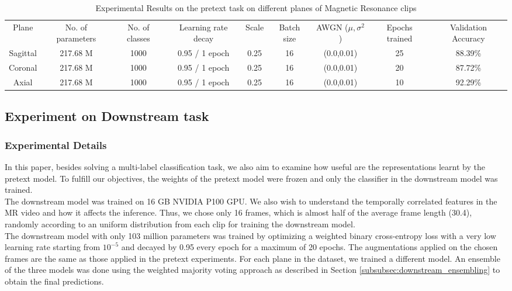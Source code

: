 \documentclass[journal]{IEEEtai}
\begin{document}
\begin{table*}[!ht]
    \centering
    \bgroup
    \caption{Experimental Results on the pretext task on different planes of Magnetic Resonance clips}
    \def\arraystretch{1.5}
    \begin{tabular}{c|c|c|c|c|c|c|c|c}
    \hline
       \multirow{2}{*}{Plane} & \multirow{2}{1.5cm}{\centering No. of parameters} & \multirow{2}{1cm}{\centering No. of classes} & \multirow{2}{2cm}{\centering Learning rate decay} & \multirow{2}{*}{Scale} & \multirow{2}{1cm}{\centering Batch size} & \multirow{2}{1.5cm}{\centering AWGN ($\mu,\sigma^2$)} & \multirow{2}{1.0cm}{\centering Epochs trained} & \multirow{2}{1.5cm}{\centering Validation Accuracy}\\
       {} &{} &{} &{} &{} &{} &{} &{} &{}   \\\hline \hline
Sagittal & 217.68 M & 1000 & 0.95 / 1 epoch & 0.25 & 16  & (0.0,0.01) & 25 & 88.39\%\\ \hline
Coronal & 217.68 M & 1000 & 0.95 / 1 epoch & 0.25 & 16  & (0.0,0.01) & 20 & 87.72\% \\\hline
Axial & 217.68 M & 1000 & 0.95 / 1 epoch & 0.25 & 16  & (0.0,0.01) & 10 & 92.29\%\\ \hline
    \end{tabular}
    \label{tab:exp_pretext}
    \egroup
\end{table*}




\subsection{Experiment on Downstream task}
\label{subsec:exp_downstream}

\subsubsection{Experimental Details}
\label{subsubsec:down_exp_det}
\indent In this paper, besides solving a multi-label classification task, we also aim to examine how useful are the representations learnt by the pretext model. To fulfill our objectives, the weights of the pretext model were frozen and only the classifier in the downstream model was trained.\\ \indent The downstream model was trained on 16 GB NVIDIA P100 GPU. We also wish to understand the temporally correlated features in the MR video and how it affects the inference. Thus, we chose only 16 frames, which is almost half of the average frame length (30.4), randomly according to an uniform distribution from each clip for training the downstream model. \\
\indent The downstream model with only 103 million parameters was trained by optimizing a weighted binary cross-entropy loss with a very low learning rate starting from $10^{-5}$ and decayed by 0.95 every epoch for a maximum of 20 epochs. The augmentations applied on the chosen frames are the same as those applied in the pretext experiments. For each plane in the dataset, we trained a different model. An ensemble of the three models was done using the weighted majority voting approach as described in Section \ref{subsubsec:downstream_ensembling} to obtain the final predictions. 
\end{document}
